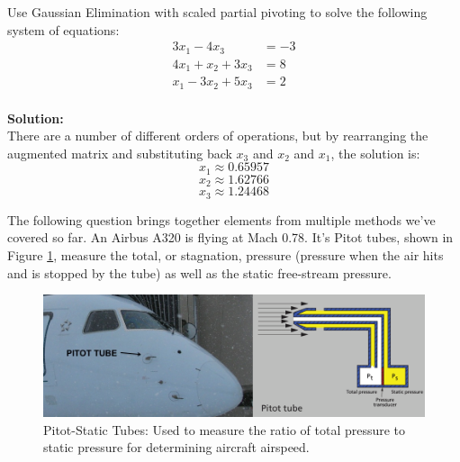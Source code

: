 \documentclass[12pt]{article}
\begin{document}
\begin{description}
\begin{enumerate}[label=\textbf{(\alph*)}]
    \end{enumerate}
    \fi
    \color{black}

\item[3. Gaussian Elimination (20 pts).] Use Gaussian Elimination with scaled partial pivoting to solve the following system of equations:
 \begin{equation*}
 \begin{aligned}
    3x_1 - 4x_3 &= -3 \\
    4x_1 + x_2 + 3x_3 &= 8 \\ 
    x_1 - 3x_2 + 5x_3 &= 2 \\ 
 \end{aligned}
 \end{equation*}

 \ifsolution
 \color{red}
 {\bf Solution:}\\

There are a number of different orders of operations, but by rearranging the augmented matrix and substituting back $x_3$ and $x_2$ and $x_1$, the solution is:
$$x_1 \approx 0.65957$$
$$x_2 \approx 1.62766$$
$$x_3 \approx 1.24468$$
 
\color{black}
\fi


\item[4. An Aerospace Application \color{red} (Coding Problem) \color{black} (30 pts).] The following question brings together elements from multiple methods we've covered so far. An Airbus A320 is flying at Mach 0.78. It's Pitot tubes, shown in Figure \ref{fig:Pitot}, measure the total, or stagnation, pressure (pressure when the air hits and is stopped by the tube) as well as the static free-stream pressure.

\begin{figure}[H]
	\centering\includegraphics[width=4.5in]{pitot.PNG}
	\caption{Pitot-Static Tubes: Used to measure the ratio of total pressure to static pressure for determining aircraft airspeed.}
	\label{fig:Pitot}
\end{figure}


\end{description}
\end{document}
